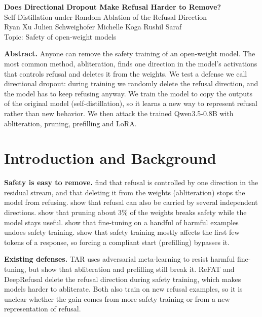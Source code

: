 \documentclass[12pt]{article}
\begin{document}
\begin{center}
{\Large\bfseries Does Directional Dropout Make Refusal Harder to Remove?}\\[1pt]
{\large Self-Distillation under Random Ablation of the Refusal Direction}\\[3pt]
Ryan Xu \quad Julien Schweighofer \quad Michelle Koga \quad Rushil Saraf\\
{\small Topic: Safety of open-weight models}
\end{center}
\vspace{-6pt}

\textbf{Abstract.}
Anyone can remove the safety training of an open-weight model.
The most common method, abliteration, finds one direction in the model's activations that controls refusal and deletes it from the weights.
We test a defense we call directional dropout: during training we randomly delete the refusal direction, and the model has to keep refusing anyway.
We train the model to copy the outputs of the original model (self-distillation), so it learns a new way to represent refusal rather than new behavior.
We then attack the trained Qwen3.5-0.8B with abliteration, pruning, prefilling and LoRA.

\section{Introduction and Background}
\textbf{Safety is easy to remove.}
\citet{arditi2024refusal} find that refusal is controlled by one direction in the residual stream, and that deleting it from the weights (abliteration) stops the model from refusing.
\citet{wollschlager2025geometry} show that refusal can also be carried by several independent directions.
\citet{wei2024brittleness} show that pruning about 3\% of the weights breaks safety while the model stays useful.
\citet{qi2024finetuning} show that fine-tuning on a handful of harmful examples undoes safety training.
\citet{qi2025shallow} show that safety training mostly affects the first few tokens of a response, so forcing a compliant start (prefilling) bypasses it.

\textbf{Existing defenses.}
TAR \citep{tamirisa2025tar} uses adversarial meta-learning to resist harmful fine-tuning, but \citet{kuo2026simple} show that abliteration and prefilling still break it.
ReFAT \citep{yu2025refat} and DeepRefusal \citep{xie2025deeprefusal} delete the refusal direction during safety training, which makes models harder to abliterate.
Both also train on new refusal examples, so it is unclear whether the gain comes from more safety training or from a new representation of refusal.
\end{document}
